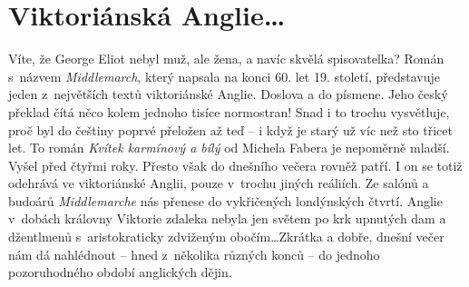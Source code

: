 \section{Viktoriánská Anglie\ldots}

\noindent
Víte, že George Eliot nebyl muž, ale žena, a navíc skvělá spisovatelka? Román s názvem \textit{Middlemarch}, který napsala na konci 60. let 19. století, představuje jeden z největších textů viktoriánské Anglie. Doslova a do písmene. Jeho český překlad čítá něco kolem jednoho tisíce normostran! Snad i to trochu vysvětluje, proč byl do češtiny poprvé přeložen až teď -- i když je starý už víc než sto třicet let. To román \textit{Kvítek karmínový a bílý} od Michela Fabera je nepoměrně mladší. Vyšel před čtyřmi roky. Přesto však do dnešního večera rovněž patří. I on se totiž odehrává ve viktoriánské Anglii, pouze v trochu jiných reáliích. Ze salónů a budoárů \textit{Middlemarche} nás přenese do vykřičených londýnských čtvrtí. Anglie v dobách královny Viktorie zdaleka nebyla jen světem po krk upnutých dam a džentlmenů s aristokraticky zdviženým obočím\ldots Zkrátka a dobře, dnešní večer nám dá nahlédnout -- hned z několika různých konců -- do jednoho pozoruhodného období anglických dějin.

